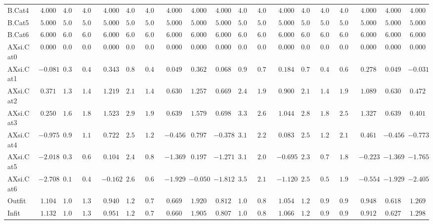 \documentclass[6pt]{article}
\begin{document}
{\begin{longtable}{lrrrrrrrrrrrrrrrrrr}
B.Cat4&$ 4.000$&$ 4.000$&$ 4.000$&$ 4.000$&$ 4.000$&$ 4.000$&$ 4.000$&$ 4.000$&$ 4.000$&$ 4.000$&$ 4.000$&$ 4.000$&$ 4.000$&$ 4.000$&$ 4.000$&$ 4.000$&$ 4.000$&$ 4.000$\tabularnewline
B.Cat5&$ 5.000$&$ 5.000$&$ 5.000$&$ 5.000$&$ 5.000$&$ 5.000$&$ 5.000$&$ 5.000$&$ 5.000$&$ 5.000$&$ 5.000$&$ 5.000$&$ 5.000$&$ 5.000$&$ 5.000$&$ 5.000$&$ 5.000$&$ 5.000$\tabularnewline
B.Cat6&$ 6.000$&$ 6.000$&$ 6.000$&$ 6.000$&$ 6.000$&$ 6.000$&$ 6.000$&$ 6.000$&$ 6.000$&$ 6.000$&$ 6.000$&$ 6.000$&$ 6.000$&$ 6.000$&$ 6.000$&$ 6.000$&$ 6.000$&$ 6.000$\tabularnewline
AXsi.Cat0&$ 0.000$&$ 0.000$&$ 0.000$&$ 0.000$&$ 0.000$&$ 0.000$&$ 0.000$&$ 0.000$&$ 0.000$&$ 0.000$&$ 0.000$&$ 0.000$&$ 0.000$&$ 0.000$&$ 0.000$&$ 0.000$&$ 0.000$&$ 0.000$\tabularnewline
AXsi.Cat1&$-0.081$&$ 0.390$&$ 0.445$&$ 0.343$&$ 0.807$&$ 0.483$&$ 0.049$&$ 0.362$&$ 0.068$&$ 0.961$&$ 0.728$&$ 0.184$&$ 0.797$&$ 0.464$&$ 0.690$&$ 0.278$&$ 0.049$&$-0.031$\tabularnewline
AXsi.Cat2&$ 0.371$&$ 1.312$&$ 1.424$&$ 1.219$&$ 2.146$&$ 1.498$&$ 0.630$&$ 1.257$&$ 0.669$&$ 2.456$&$ 1.989$&$ 0.900$&$ 2.127$&$ 1.461$&$ 1.912$&$ 1.089$&$ 0.630$&$ 0.472$\tabularnewline
AXsi.Cat3&$ 0.250$&$ 1.662$&$ 1.829$&$ 1.523$&$ 2.913$&$ 1.941$&$ 0.639$&$ 1.579$&$ 0.698$&$ 3.377$&$ 2.678$&$ 1.044$&$ 2.883$&$ 1.885$&$ 2.562$&$ 1.327$&$ 0.639$&$ 0.401$\tabularnewline
AXsi.Cat4&$-0.975$&$ 0.908$&$ 1.131$&$ 0.722$&$ 2.576$&$ 1.280$&$-0.456$&$ 0.797$&$-0.378$&$ 3.195$&$ 2.262$&$ 0.083$&$ 2.536$&$ 1.205$&$ 2.108$&$ 0.461$&$-0.456$&$-0.773$\tabularnewline
AXsi.Cat5&$-2.018$&$ 0.336$&$ 0.615$&$ 0.104$&$ 2.421$&$ 0.801$&$-1.369$&$ 0.197$&$-1.271$&$ 3.195$&$ 2.029$&$-0.695$&$ 2.372$&$ 0.708$&$ 1.836$&$-0.223$&$-1.369$&$-1.765$\tabularnewline
AXsi.Cat6&$-2.708$&$ 0.117$&$ 0.451$&$-0.162$&$ 2.619$&$ 0.674$&$-1.929$&$-0.050$&$-1.812$&$ 3.547$&$ 2.148$&$-1.120$&$ 2.559$&$ 0.563$&$ 1.917$&$-0.554$&$-1.929$&$-2.405$\tabularnewline
Outfit&$ 1.104$&$ 1.006$&$ 1.342$&$ 0.940$&$ 1.269$&$ 0.747$&$ 0.669$&$ 1.920$&$ 0.812$&$ 1.095$&$ 0.884$&$ 1.054$&$ 1.273$&$ 0.960$&$ 0.962$&$ 0.948$&$ 0.618$&$ 1.269$\tabularnewline
Infit&$ 1.132$&$ 1.014$&$ 1.304$&$ 0.951$&$ 1.236$&$ 0.767$&$ 0.660$&$ 1.905$&$ 0.807$&$ 1.091$&$ 0.877$&$ 1.066$&$ 1.251$&$ 0.976$&$ 0.962$&$ 0.912$&$ 0.627$&$ 1.298$\tabularnewline
\hline
\end{longtable}}
\end{document}
